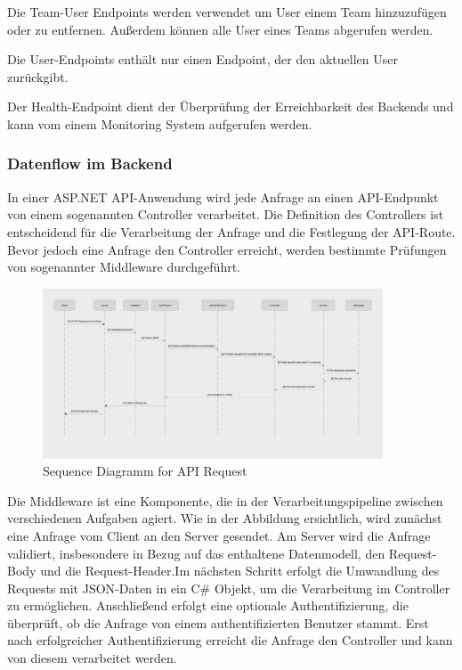 \noindent Die Team-User Endpoints werden verwendet um User einem Team hinzuzufügen oder zu entfernen. 
Außerdem können alle User eines Teams abgerufen werden. \newline

\noindent Die User-Endpoints enthält nur einen Endpoint, der den aktuellen User zurückgibt. \newline

\noindent Der Health-Endpoint dient der Überprüfung der Erreichbarkeit des Backends und kann 
vom einem Monitoring System aufgerufen werden.

\subsubsection{Datenflow im Backend}

In einer ASP.NET API-Anwendung wird jede Anfrage an einen API-Endpunkt von einem sogenannten 
Controller verarbeitet. Die Definition des Controllers ist entscheidend für die Verarbeitung 
der Anfrage und die Festlegung der API-Route. Bevor jedoch eine Anfrage den Controller erreicht, 
werden bestimmte Prüfungen von sogenannter Middleware durchgeführt. \newline

\begin{figure}[H]
  \centering
  \includegraphics[width=0.9\textwidth]{img/API-Sequence-Diagramm.png}
  \caption{Sequence Diagramm for API Request}
\end{figure}

\noindent Die Middleware ist eine Komponente, die in der Verarbeitungspipeline zwischen verschiedenen 
Aufgaben agiert. Wie in der Abbildung ersichtlich, wird zunächst eine Anfrage vom Client an den Server 
gesendet. Am Server wird die Anfrage validiert, insbesondere in Bezug auf das enthaltene Datenmodell,
den Request-Body und die Request-Header.Im nächsten Schritt erfolgt die Umwandlung des Requests mit 
JSON-Daten in ein C\# Objekt, um die Verarbeitung im Controller zu ermöglichen. Anschließend erfolgt eine 
optionale Authentifizierung, die überprüft, ob die Anfrage von einem authentifizierten Benutzer stammt.
Erst nach erfolgreicher Authentifizierung erreicht die Anfrage den Controller und kann von diesem verarbeitet 
werden. \newline

